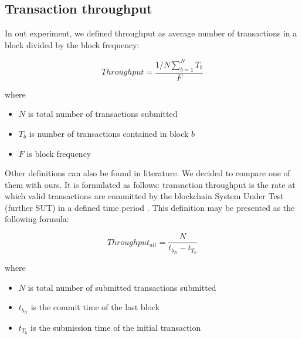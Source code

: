 \subsection{Transaction throughput} \label{throughput}
In out experiment, we defined throughput as average number of transactions in a block divided by the block frequency:

$$Throughput = \frac{1/N \sum_{b=1}^{N} T_b}{F}$$

where
\begin{itemize}
    \item $N$ is total number of transactions submitted
    \item $T_b$ is number of transactions contained in block $b$
    \item $F$ is block frequency
\end{itemize}

Other definitions can also be found in literature. We decided to compare one of them with ours. It is formulated as follows: transaction throughput is the rate at which valid transactions are committed by the blockchain System Under Test (further SUT) in a defined time period \cite{hyperledger_paper}. This definition may be presented as the following formula:

$$Throughput_{alt} = \frac{N}{t_{b_N} - t_{T_0}}$$

where
\begin{itemize}
    \item $N$ is total number of submitted transactions submitted
    \item $t_{b_N}$ is the commit time of the last block
    \item $t_{T_0}$ is the submission time of the initial transaction
\end{itemize}
